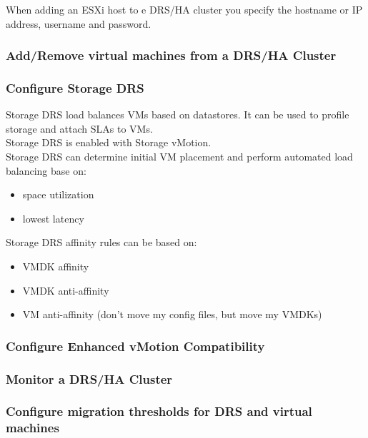 When adding an ESXi host to e DRS/HA cluster you specify the hostname or
IP address, username and password.

\subsubsection{Add/Remove virtual machines from a DRS/HA Cluster}

\subsubsection{Configure Storage DRS}

Storage DRS load balances VMs based on datastores. It can be used to profile
storage and attach SLAs to VMs.\\

Storage DRS is enabled with Storage vMotion.\\

Storage DRS can determine initial VM placement and perform automated load
balancing base on:

\begin{itemize}

\item space utilization
\item lowest latency

\end{itemize}

Storage DRS affinity rules can be based on:

\begin{itemize}

\item VMDK affinity
\item VMDK anti-affinity
\item VM anti-affinity (don't move my config files, but move my VMDKs)

\end{itemize}

\subsubsection{Configure Enhanced vMotion Compatibility}

\subsubsection{Monitor a DRS/HA Cluster}

\subsubsection{Configure migration thresholds for DRS and virtual machines}

